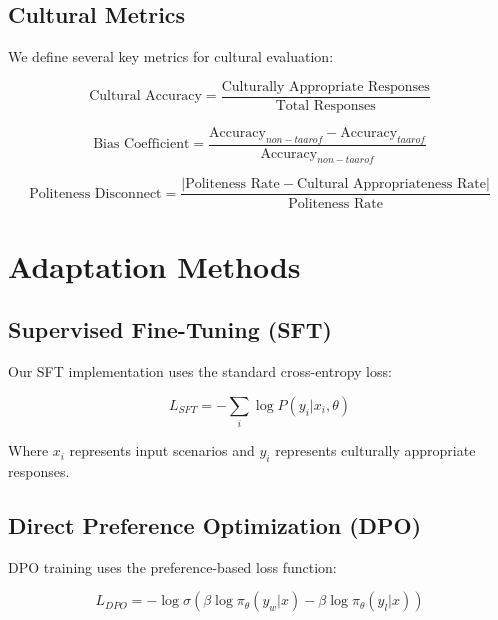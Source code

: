 \documentclass[11pt,twocolumn]{article}
\begin{document}
\subsection{Cultural Metrics}

We define several key metrics for cultural evaluation:

\begin{equation}
\text{Cultural Accuracy} = \frac{\text{Culturally Appropriate Responses}}{\text{Total Responses}}
\end{equation}

\begin{equation}
\text{Bias Coefficient} = \frac{\text{Accuracy}_{non-taarof} - \text{Accuracy}_{taarof}}{\text{Accuracy}_{non-taarof}}
\end{equation}

\begin{equation}
\text{Politeness Disconnect} = \frac{|\text{Politeness Rate} - \text{Cultural Appropriateness Rate}|}{\text{Politeness Rate}}
\end{equation}

\section{Adaptation Methods}

\subsection{Supervised Fine-Tuning (SFT)}

Our SFT implementation uses the standard cross-entropy loss:

\begin{equation}
L_{SFT} = -\sum_i \log P(y_i | x_i, \theta)
\end{equation}

Where $x_i$ represents input scenarios and $y_i$ represents culturally appropriate responses.

\subsection{Direct Preference Optimization (DPO)}

DPO training uses the preference-based loss function:

\begin{equation}
L_{DPO} = -\log \sigma(\beta \log \pi_\theta(y_w|x) - \beta \log \pi_\theta(y_l|x))
\end{equation}
\end{document}
